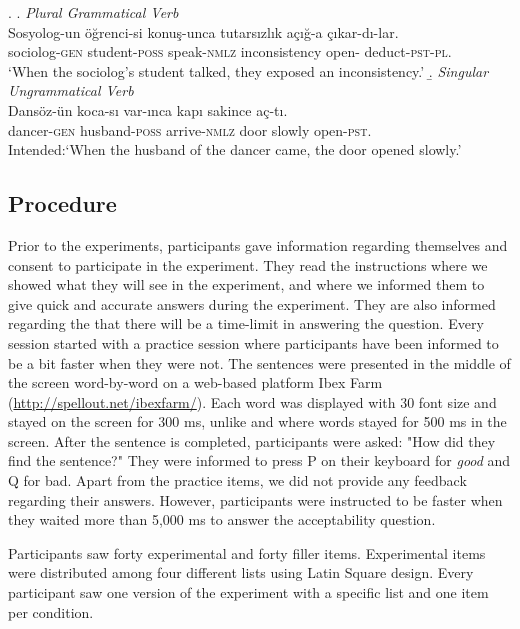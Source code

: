 \documentclass[doc,a4paper,man,natbib,floatsintext,noextraspace]{apa6}\usepackage[]{graphicx}\usepackage[]{color}
\begin{document}
\ex. \label{item:exp1FillerItems}
\a. \textit{Plural Grammatical Verb}\\ 
\gll Sosyolog-un öğrenci-si konuş-unca tutarsızlık açığ-a çıkar-dı-lar.\\ 
sociolog-\textsc{gen}  student-\textsc{poss} speak-\textsc{nmlz} inconsistency  open-\Dat{} deduct-\textsc{pst}-\textsc{pl}.\\
\glt `When the sociolog's student talked, they exposed an inconsistency.' 
\b. \textit{Singular Ungrammatical Verb}\\ 
\gll *Dansöz-ün koca-sı var-ınca kapı sakince aç-tı.\\ 
dancer-\textsc{gen}  husband-\textsc{poss} arrive-\textsc{nmlz} door slowly  open-\textsc{pst}.\\
\glt Intended:`When the husband of the dancer came, the door opened slowly.'

\subsection{Procedure} \label{sec:exp1:procedure}

Prior to the experiments, participants gave information regarding themselves and consent to participate in the experiment. They read the instructions where we showed what they will see in the experiment, and where we informed them to give quick and accurate answers during the experiment. They are also informed regarding the that there will be a time-limit in answering the question. Every session started with a practice session where participants have been informed to be a bit faster when they were not. The sentences were presented in the middle of the screen word-by-word on a web-based platform Ibex Farm (\url{http://spellout.net/ibexfarm/}). Each word was displayed with 30 font size and stayed on the screen for 300 ms, unlike \citet{LagoEtAl:2018} and \citet{WagersEtAl:2009} where words stayed for 500 ms in the screen. After the sentence is completed, participants were asked: "How did they find the sentence?" They were informed to press P on their keyboard for \textit{good} and Q for bad. Apart from the practice items, we did not provide any feedback regarding their answers. However, participants were instructed to be faster when they waited more than 5,000 ms to answer the acceptability question. 

Participants saw forty experimental and forty filler items. Experimental items were distributed among four different lists using Latin Square design. Every participant saw one version of the experiment with a specific list and one item per condition.   
\end{document}
